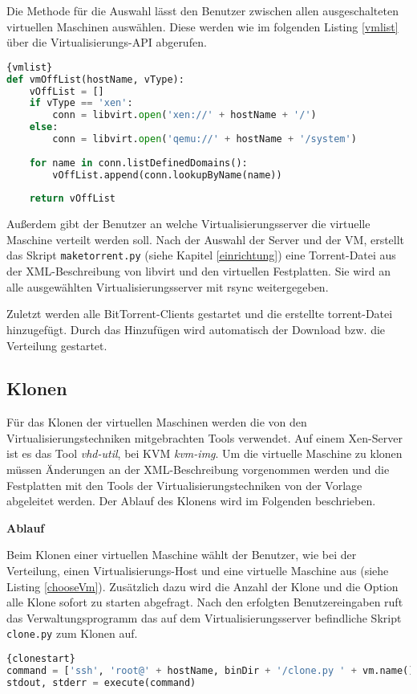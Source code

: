 Die Methode für die Auswahl lässt den Benutzer zwischen allen ausgeschalteten virtuellen Maschinen auswählen. Diese werden wie im folgenden Listing \ref{vmlist} über die Virtualisierungs-API abgerufen.
\\
\begin{lstlisting}[caption=Abruf der ausgeschalteten virtuellen mit libvirt,language=Python, label=vmlist]{vmlist}
def vmOffList(hostName, vType):
	vOffList = []
	if vType == 'xen':
		conn = libvirt.open('xen://' + hostName + '/')
	else:
		conn = libvirt.open('qemu://' + hostName + '/system')
	
	for name in conn.listDefinedDomains():
		vOffList.append(conn.lookupByName(name))
	
	return vOffList
\end{lstlisting}
Außerdem gibt der Benutzer an welche Virtualisierungsserver die virtuelle Maschine verteilt werden soll. Nach der Auswahl der Server und der VM, erstellt das Skript \lstinline|maketorrent.py| (siehe Kapitel \ref{einrichtung}) eine Torrent-Datei aus der XML-Beschreibung von libvirt und den virtuellen Festplatten. Sie wird an alle ausgewählten Virtualisierungsserver mit rsync weitergegeben. 


Zuletzt werden alle BitTorrent-Clients gestartet und die erstellte torrent-Datei hinzugefügt. Durch das Hinzufügen wird automatisch der Download bzw. die Verteilung gestartet.

\subsection{Klonen}
Für das Klonen der virtuellen Maschinen werden die von den Virtualisierungstechniken mitgebrachten Tools verwendet. Auf einem Xen-Server ist es das Tool \textit{vhd-util}, bei KVM \textit{kvm-img}. Um die virtuelle Maschine zu klonen müssen Änderungen an der XML-Beschreibung vorgenommen werden und die Festplatten mit den Tools der Virtualisierungstechniken von der Vorlage abgeleitet werden. Der Ablauf des Klonens wird im Folgenden beschrieben.  %

\textbf{Ablauf}

Beim Klonen einer virtuellen Maschine wählt der Benutzer, wie bei der Verteilung, einen Virtualisierungs-Host und eine virtuelle Maschine aus (siehe Listing \ref{chooseVm}). Zusätzlich dazu wird die Anzahl der Klone und die Option alle Klone sofort zu starten abgefragt. Nach den erfolgten Benutzereingaben ruft das Verwaltungsprogramm das auf dem Virtualisierungsserver befindliche Skript \lstinline|clone.py| zum Klonen auf.
\\
\begin{lstlisting}[caption=Starten des Klonvorgangs,language=Python,label=clonestart]{clonestart}
command = ['ssh', 'root@' + hostName, binDir + '/clone.py ' + vm.name() + ' ' + cloneCount + ' ' + autostart + ' ' + str(debug)]
stdout, stderr = execute(command)
\end{lstlisting}

